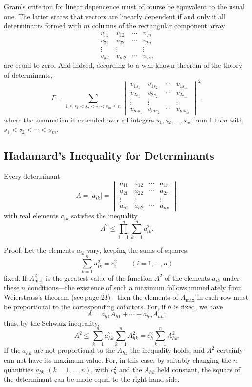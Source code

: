 Gram's criterion for linear dependence must of course be equivalent to the usual one. The latter states that vectors are linearly dependent if and only if all determinants formed with $m$ columns of the rectangular component array
\[
\begin{matrix}v_{11}&v_{12}&\cdots&v_{1n}\\v_{21}&v_{22}&\cdots&v_{2n}\\\vdots&\vdots&&\vdots\\v_{m1}&v_{m2}&\cdots&v_{mn}\end{matrix}
\]
are equal to zero. And indeed, according to a well-known theorem of the theory of determinants,
\begin{equation*}
\Gamma=\sum_{1\le s_1<s_2<\cdots<s_m\le n}
\begin{vmatrix}v_{1s_1}&v_{1s_2}&\cdots&v_{1s_m}\\v_{2s_1}&v_{2s_2}&\cdots&v_{2s_m}\\\vdots&\vdots&&\vdots\\v_{ms_1}&v_{ms_2}&\cdots&v_{ms_m}\end{vmatrix}^{2}. \tag{45}
\end{equation*}
where the summation is extended over all integers $s_1,s_2,\ldots,s_m$ from 1 to $n$ with $s_1<s_2<\cdots<s_m$.

\subsection{Hadamard's Inequality for Determinants}
Every determinant
\[
A=|a_{ik}|=\begin{vmatrix}a_{11}&a_{12}&\cdots&a_{1n}\\a_{21}&a_{22}&\cdots&a_{2n}\\\vdots&\vdots&&\vdots\\a_{n1}&a_{n2}&\cdots&a_{nn}\end{vmatrix}
\]
with real elements $a_{ik}$ satisfies the inequality
\begin{equation*}A^2\le\prod_{i=1}^{n}\sum_{k=1}^{n}a_{ik}^2. \tag{46}\end{equation*}

Proof: Let the elements $a_{ik}$ vary, keeping the sums of squares
\[\sum_{k=1}^{n}a_{ik}^2=c_i^2\qquad(i=1,\ldots,n)\]
fixed. If $A_{\max}^2$ is the greatest value of the function $A^2$ of the elements $a_{ik}$ under these $n$ conditions---the existence of such a maximum follows immediately from Weierstrass's theorem (see page 23)---then the elements of $A_{\max}$ in each row must be proportional to the corresponding cofactors. For, if $h$ is fixed, we have
\[A=a_{h1}A_{h1}+\cdots+a_{hn}A_{hn};\]
thus, by the Schwarz inequality,
\[A^2\le\sum_{k=1}^{n}a_{hk}^2\sum_{k=1}^{n}A_{hk}^2=c_h^2\sum_{k=1}^{n}A_{hk}^2.\]
If the $a_{hk}$ are not proportional to the $A_{hk}$ the inequality holds, and $A^2$ certainly can not have its maximum value. For, in this case, by suitably changing the $n$ quantities $a_{hk}$ $(k=1,\ldots,n)$, with $c_h^2$ and the $A_{hk}$ held constant, the square of the determinant can be made equal to the right-hand side.

